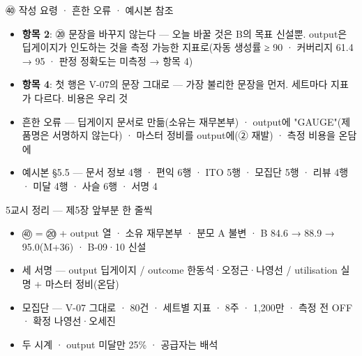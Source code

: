 \begin{frame}{㊵ 작성 요령 · 흔한 오류 · 예시본 참조}
\begin{itemize}
\item \textbf{항목 2}: ⑳ 문장을 바꾸지 않는다 — 오늘 바꿀 것은 B의 목표 신설뿐. output은 딥게이지가 인도하는 것을 측정 가능한 지표로(자동 생성률 ≥ 90 · 커버리지 61.4 → 95 · 판정 정확도는 미측정 → 항목 4)
\item \textbf{항목 4}: 첫 행은 V-07의 문장 그대로 — 가장 불리한 문장을 먼저. 세트마다 지표가 다르다. 비용은 우리 것
\item 흔한 오류 — 딥게이지 문서로 만듦(소유는 재무본부) · output에 "GAUGE"(제품명은 서명하지 않는다) · 마스터 정비를 output에(② 재발) · 측정 비용을 온담에
\item 예시본 §5.5 — 문서 정보 4행 · 편익 6행 · ITO 5행 · 모집단 5행 · 리뷰 4행 · 미달 4행 · 사슬 6행 · 서명 4
\end{itemize}
\end{frame}

\begin{frame}{5교시 정리 — 제5장 앞부분 한 줄씩}
\begin{itemize}
\item ㊵ = ⑳ + output 열 · 소유 재무본부 · 분모 A 불변 · B 84.6 → 88.9 → 95.0(M+36) · B-09·10 신설
\item 세 서명 — output 딥게이지 / outcome 한동석·오정근·나영선 / utilisation 실명 + 마스터 정비(온담)
\item 모집단 — V-07 그대로 · 80건 · 세트별 지표 · 8주 · 1,200만 · 측정 전 OFF · 확정 나영선·오세진
\item 두 시계 · output 미달만 25\% · 공급자는 배석
\end{itemize}
\end{frame}

